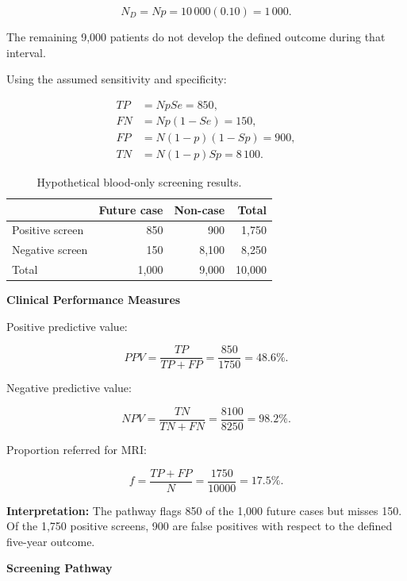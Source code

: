 \documentclass[11pt,a4paper]{article}
\newcommand{\subheading}[1]{%
    \vspace{3mm}
    {\large\bfseries\color{DTUblue}#1}\par
}
\begin{document}
\[
N_D=Np=10\,000(0.10)=1\,000.
\]

The remaining 9,000 patients do not develop
the defined outcome during that interval.

Using the assumed sensitivity and specificity:

\begin{align*}
TP &= NpSe = 850,\\
FN &= Np(1-Se) = 150,\\
FP &= N(1-p)(1-Sp) = 900,\\
TN &= N(1-p)Sp = 8\,100.
\end{align*}

\begin{table}[H]
\centering
\caption{Hypothetical blood-only screening results.}
\begin{tabular}{@{}lrrr@{}}
\toprule
& \textbf{Future case}
& \textbf{Non-case}
& \textbf{Total} \\
\midrule
Positive screen & 850 & 900 & 1,750 \\
Negative screen & 150 & 8,100 & 8,250 \\
\midrule
Total & 1,000 & 9,000 & 10,000 \\
\bottomrule
\end{tabular}
\end{table}

\subheading{Clinical Performance Measures}

Positive predictive value:

\[
PPV=\frac{TP}{TP+FP}
=\frac{850}{1750}
=\boxed{48.6\%}.
\]

Negative predictive value:

\[
NPV=\frac{TN}{TN+FN}
=\frac{8100}{8250}
=\boxed{98.2\%}.
\]

Proportion referred for MRI:

\[
f=\frac{TP+FP}{N}
=\frac{1750}{10000}
=\boxed{17.5\%}.
\]

\textbf{Interpretation:}
The pathway flags 850 of the 1,000 future cases
but misses 150. Of the 1,750 positive screens,
900 are false positives with respect to the
defined five-year outcome.

\subheading{Screening Pathway}
\end{document}
